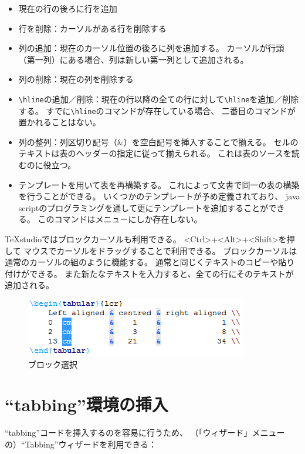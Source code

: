 \begin{itemize}
\item
  現在の行の後ろに行を追加
\item
  行を削除：カーソルがある行を削除する
\item
  列の追加：現在のカーソル位置の後ろに列を追加する。
  カーソルが行頭（第一列）にある場合、列は新しい第一列として追加される。
\item
  列の削除：現在の列を削除する
\item
  \verb+\hline+の追加／削除：現在の行以降の全ての行に対して\verb+\hline+を追加／削除する。
  すでに\verb+\hline+のコマンドが存在している場合、
  二番目のコマンドが置かれることはない。
\item
  列の整列：列区切り記号（\&）を空白記号を挿入することで揃える。
  セルのテキストは表のヘッダーの指定に従って揃えられる。
  これは表のソースを読むのに役立つ。
\item
  テンプレートを用いて表を再構築する。
  これによって文書で同一の表の構築を行うことができる。
  いくつかのテンプレートが予め定義されており、
  java scriptのプログラミングを通して更にテンプレートを追加することができる。
  このコマンドはメニューにしか存在しない。
\end{itemize}

TeXstudioではブロックカーソルも利用できる。
\textless{}Ctrl\textgreater{}+\textless{}Alt\textgreater{}+\textless{}Shift\textgreater{}を押して
マウスでカーソルをドラッグすることで利用できる。
ブロックカーソルは通常のカーソルの組のように機能する。
通常と同じくテキストのコピーや貼り付けができる。
また新たなテキストを入力すると、全ての行にそのテキストが追加される。

\begin{figure}[H]
  \centering
  \includegraphics{block_selection.png}
  \caption{ブロック選択}
\end{figure}

\section{``tabbing''環境の挿入}

``tabbing''コードを挿入するのを容易に行うため、
（「ウィザード」メニューの）``Tabbing''ウィザードを利用できる：

